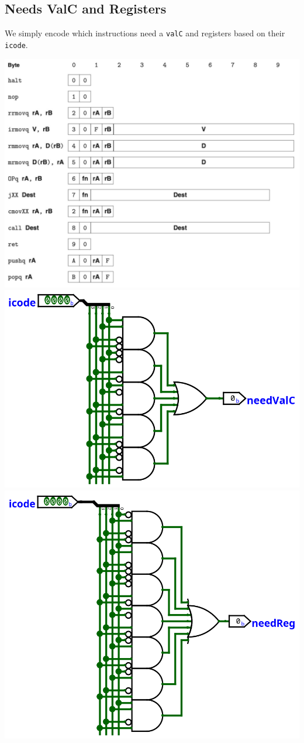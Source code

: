 \documentclass{article}
\begin{document}
\subsection{Needs ValC and Registers}
We simply encode which instructions need a \verb+valC+ and registers based on their \verb+icode+. 
\begin{center}
    \includegraphics[scale=.6]{icode.png} \\
    \includegraphics[scale=.7]{needsValC.png}
    \includegraphics[scale=.7]{needsReg.png}
\end{center}
\end{document}
